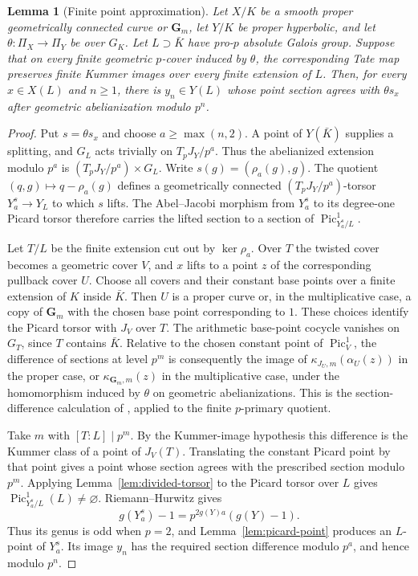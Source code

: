 \documentclass[11pt,a4paper]{article}
\numberwithin{equation}{section}
\theoremstyle{plain}
\newtheorem{lemma}[theorem]{Lemma}
\theoremstyle{definition}
\theoremstyle{remark}
\newcommand{\Gm}{\mathbf G_m}
\DeclareMathOperator{\Pic}{Pic}
\begin{document}
\begin{lemma}[Finite point approximation]
\label{lem:point-approximation}
Let $X/K$ be a smooth proper geometrically connected curve or $\Gm$, let
$Y/K$ be proper hyperbolic, and let $\theta:\Pi_X\to\Pi_Y$ be over $G_K$.
Let $L\supset\bar K$ have pro-$p$ absolute Galois group. Suppose that on
every finite geometric $p$-cover induced by $\theta$, the corresponding
Tate map preserves finite Kummer images over every finite extension of
$L$. Then, for every $x\in X(L)$ and $n\ge1$, there is $y_n\in Y(L)$
whose point section agrees with $\theta s_x$ after geometric
abelianization modulo $p^n$.
\end{lemma}
\begin{proof}
Put $s=\theta s_x$ and choose $a\ge\max(n,2)$.
A point of $Y(\bar K)$ supplies a splitting, and
$G_L$ acts trivially on $T_pJ_Y/p^a$. Thus the abelianized extension
modulo $p^a$ is $(T_pJ_Y/p^a)\times G_L$. Write
$s(g)=(\rho_a(g),g)$. The quotient $(q,g)\mapsto q-\rho_a(g)$ defines a
geometrically connected $(T_pJ_Y/p^a)$-torsor $Y_a^s\to Y_L$ to which
$s$ lifts.
The Abel--Jacobi morphism from $Y_a^s$ to its degree-one Picard torsor
therefore carries the lifted section to a section of
$\Pic^1_{Y_a^s/L}$.

Let $T/L$ be the finite extension cut out by $\ker\rho_a$. Over $T$ the
twisted cover becomes a geometric cover $V$, and $x$ lifts to a point $z$
of the corresponding pullback cover $U$. Choose all covers and their
constant base points over a finite extension of $K$ inside $\bar K$.
Then $U$ is a proper curve or, in the multiplicative case, a copy of
$\Gm$ with the chosen base point corresponding to $1$.
These choices identify the Picard torsor with $J_V$ over $T$.
The arithmetic base-point cocycle vanishes on $G_T$, since $T$ contains
$\bar K$. Relative to the chosen constant point of $\Pic^1_V$, the
difference of sections at level $p^m$ is consequently the image of
$\kappa_{J_U,m}(\alpha_U(z))$ in the proper case, or
$\kappa_{\Gm,m}(z)$ in the multiplicative case, under the homomorphism
induced by $\theta$ on geometric abelianizations. This is the
section-difference calculation of \cite[Lemma~2.6]{Tamagawa1997},
applied to the finite $p$-primary quotient.

Take $m$ with $[T:L]\mid p^m$. By the Kummer-image hypothesis this
difference is the Kummer class of a point of $J_V(T)$. Translating the
constant Picard point by that point gives a point whose section agrees
with the prescribed section modulo $p^m$. Applying
Lemma~\ref{lem:divided-torsor} to the Picard torsor over $L$ gives
$\Pic^1_{Y_a^s/L}(L)\ne\varnothing$.
Riemann--Hurwitz gives
\[
 g(Y_a^s)-1=p^{2g(Y)a}(g(Y)-1).
\]
Thus its genus is odd when $p=2$, and Lemma~\ref{lem:picard-point}
produces an $L$-point of $Y_a^s$. Its image $y_n$ has the required
section difference modulo $p^a$, and hence modulo $p^n$.
\end{proof}
\end{document}
